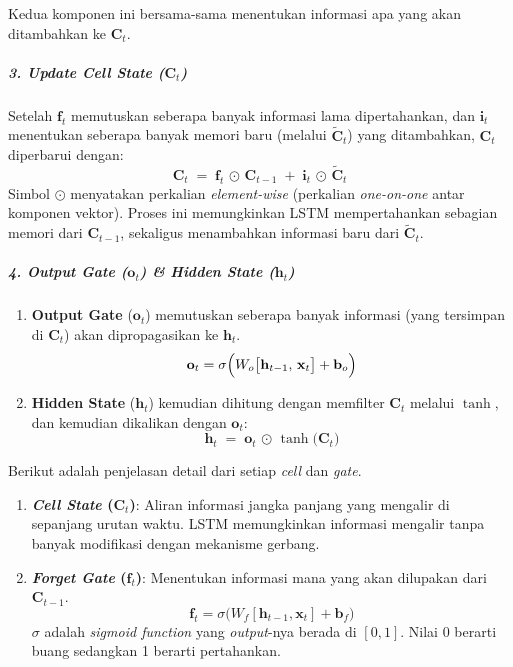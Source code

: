 \begin{enumerate}
\noindent
Kedua komponen ini bersama-sama menentukan informasi apa yang akan ditambahkan ke \(\mathbf{C}_t\).

\subparagraph{3. Update Cell State (\(\mathbf{C}_t\))} 

Setelah \(\mathbf{f}_t\) memutuskan seberapa banyak informasi lama dipertahankan, dan \(\mathbf{i}_t\) menentukan seberapa banyak memori baru (melalui \(\tilde{\mathbf{C}}_t\)) yang ditambahkan, \(\mathbf{C}_t\) diperbarui dengan:
\[
\mathbf{C}_t \;=\; 
\mathbf{f}_t \,\odot\, \mathbf{C}_{t-1}
\;+\;
\mathbf{i}_t \,\odot\, \tilde{\mathbf{C}}_t
\]
Simbol \(\odot\) menyatakan perkalian \textit{element-wise} (perkalian \textit{one-on-one} antar komponen vektor). Proses ini memungkinkan LSTM mempertahankan sebagian memori dari \(\mathbf{C}_{t-1}\), sekaligus menambahkan informasi baru dari \(\tilde{\mathbf{C}}_t\).

\subparagraph{4. Output Gate (\(\mathbf{o}_t\)) \& Hidden State (\(\mathbf{h}_t\))}
\begin{enumerate}
    \item \textbf{Output Gate} (\(\mathbf{o}_t\)) memutuskan seberapa banyak informasi (yang tersimpan di \(\mathbf{C}_t\)) akan dipropagasikan ke \(\mathbf{h}_t\).
    \[
    \mathbf{o}_t = \sigma\Bigl(W_o \bigl[\mathbf{h}_{t-1},\, \mathbf{x}_t\bigr] + \mathbf{b}_o\Bigr)
    \]
    \item \textbf{Hidden State} (\(\mathbf{h}_t\)) kemudian dihitung dengan memfilter \(\mathbf{C}_t\) melalui \(\tanh\), dan kemudian dikalikan dengan \(\mathbf{o}_t\):
    \[
    \mathbf{h}_t \;=\; \mathbf{o}_t \,\odot\, \tanh\bigl(\mathbf{C}_t\bigr)
    \]
\end{enumerate}

Berikut adalah penjelasan detail dari setiap \textit{cell} dan \textit{gate}. 
\begin{enumerate}
    \item \textbf{\textit{Cell State} (\(\mathbf{C}_t\))}:  
    Aliran informasi jangka panjang yang mengalir di sepanjang urutan waktu. LSTM memungkinkan informasi mengalir tanpa banyak modifikasi dengan mekanisme gerbang.

    \item \textbf{\textit{Forget Gate} (\(\mathbf{f}_t\))}:  
    Menentukan informasi mana yang akan dilupakan dari \(\mathbf{C}_{t-1}\).  
    \[
    \mathbf{f}_t = \sigma\bigl(W_f [\mathbf{h}_{t-1}, \mathbf{x}_t] + \mathbf{b}_f\bigr)
    \] 
    \(\sigma\) adalah \textit{sigmoid function} yang \textit{output}-nya berada di \([0,1]\). Nilai 0 berarti buang sedangkan 1 berarti pertahankan.


\end{enumerate}
\end{enumerate}
